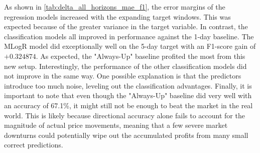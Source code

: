 \documentclass[Master,english,IEEE]{twbook}
\begin{document}
As shown in \ref{tab:delta_all_horizons_mae_f1}, the error margins of the regression models increased with the expanding target windows. This was expected because of the greater variance in the target variable. In contrast, the classification models all improved in performance against the 1-day baseline. The MLogR model did exceptionally well on the 5-day target with an F1-score gain of $+0.324874$. As expected, the "Always-Up" baseline profited the most from this new setup. Interestingly, the performance of the other classification models did not improve in the same way. One possible explanation is that the predictors introduce too much noise, leveling out the classification advantages. Finally, it is important to note that even though the "Always-Up" baseline did very well with an accuracy of 67.1\%, it might still not be enough to beat the market in the real world. This is likely because directional accuracy alone fails to account for the magnitude of actual price movements, meaning that a few severe market downturns could potentially wipe out the accumulated profits from many small correct predictions.
\end{document}
